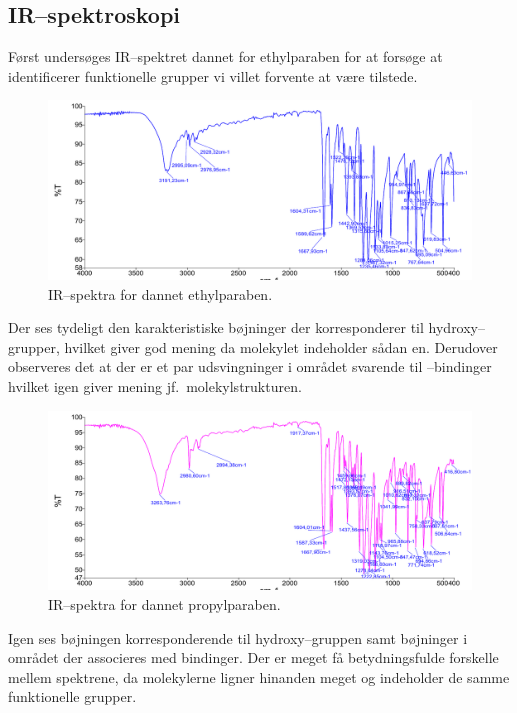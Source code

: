     \subsection{IR--spektroskopi}
    Først undersøges IR--spektret dannet for ethylparaben for at forsøge at identificerer funktionelle grupper vi villet forvente at være tilstede.
    \begin{figure}[H]
        \includegraphics[width=\linewidth]{bilag/ethylir}
        \caption{IR--spektra for dannet ethylparaben.}
    \end{figure}
    Der ses tydeligt den karakteristiske bøjninger der korresponderer til hydroxy--grupper, hvilket giver god mening da molekylet indeholder sådan en. Derudover observeres det at der er et par udsvingninger i området svarende til --bindinger hvilket igen giver mening jf.\ molekylstrukturen.
    \begin{figure}[H]
        \includegraphics[width=\linewidth]{bilag/propylir}
        \caption{IR--spektra for dannet propylparaben.}
    \end{figure}
    Igen ses bøjningen korresponderende til hydroxy--gruppen samt bøjninger i området der associeres med  bindinger. Der er meget få betydningsfulde forskelle mellem spektrene, da molekylerne ligner hinanden meget og indeholder de samme funktionelle grupper.

